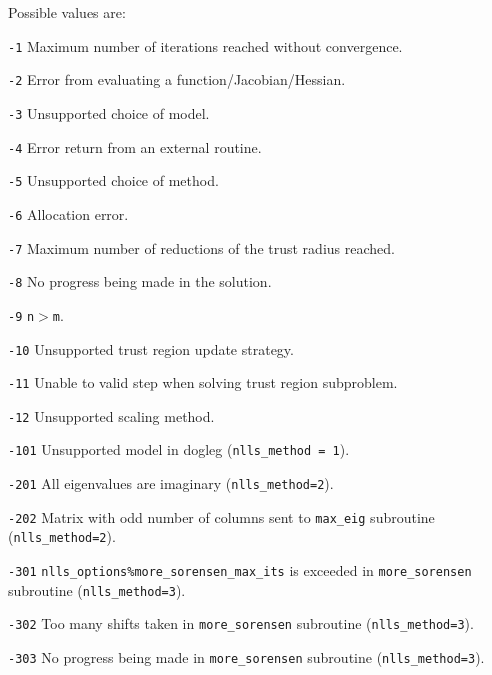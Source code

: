 
Possible values are:
\begin{description}
\item{} {\tt -1} Maximum number of iterations reached without convergence.
\item{} {\tt -2} Error from evaluating a function/Jacobian/Hessian.
\item{} {\tt -3} Unsupported choice of model.
\item{} {\tt -4} Error return from an external routine.
\item{} {\tt -5} Unsupported choice of method.
\item{} {\tt -6} Allocation error.
\item{} {\tt -7} Maximum number of reductions of the trust radius reached.
\item{} {\tt -8} No progress being made in the solution.
\item{} {\tt -9} \texttt{n}$>$\texttt{m}.
\item{} {\tt -10} Unsupported trust region update strategy.
\item{} {\tt -11} Unable to valid step when solving trust region subproblem.
\item{} {\tt -12} Unsupported scaling method.
\item{} {\tt -101} Unsupported model in dogleg (\texttt{nlls\_method = 1}).
\item{} {\tt -201}  All eigenvalues are imaginary (\texttt{nlls\_method=2}).
\item{} {\tt -202} Matrix with odd number of columns sent to \texttt{max\_eig} subroutine (\texttt{nlls\_method=2}).
\item{} {\tt -301} {\tt nlls\_options\%more\_sorensen\_max\_its} is exceeded in \texttt{more\_sorensen} subroutine (\texttt{nlls\_method=3}).
\item{} {\tt -302} Too many shifts taken in \texttt{more\_sorensen} subroutine (\texttt{nlls\_method=3}).
\item{} {\tt -303} No progress being made in \texttt{more\_sorensen} subroutine (\texttt{nlls\_method=3}).
\end{description}
